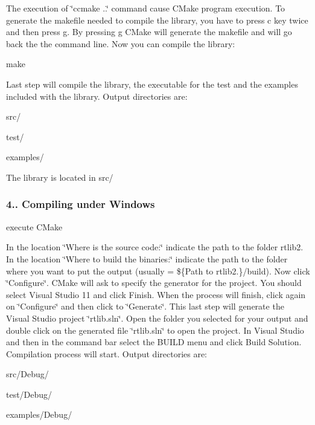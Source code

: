 The execution of \char`\"{}ccmake ..\char`\"{} command cause C\+Make program execution. To generate the makefile needed to compile the library, you have to press \textquotesingle{}c\textquotesingle{} key twice and then press \textquotesingle{}g\textquotesingle{}. By pressing \textquotesingle{}g\textquotesingle{} C\+Make will generate the makefile and will go back the the command line. Now you can compile the library\+: \begin{DoxyVerb}make 
\end{DoxyVerb}


Last step will compile the library, the executable for the test and the examples included with the library. Output directories are\+:
\begin{DoxyItemize}
\item src/
\item test/
\item examples/
\end{DoxyItemize}

The library is located in src/

\subsubsection*{4.. Compiling under Windows}

\begin{DoxyVerb}execute CMake
\end{DoxyVerb}


In the location \char`\"{}\+Where is the source code\+:\char`\"{} indicate the path to the folder rtlib2. In the location \char`\"{}\+Where to build the binaries\+:\char`\"{} indicate the path to the folder where you want to put the output (usually = \$\{Path to rtlib2.\}/build). Now click \char`\"{}\+Configure\char`\"{}. C\+Make will ask to specify the generator for the project. You should select Visual Studio 11 and click Finish. When the process will finish, click again on \char`\"{}\+Configure\char`\"{} and then click to \char`\"{}\+Generate\char`\"{}. This last step will generate the Visual Studio project \char`\"{}rtlib.\+sln\char`\"{}. Open the folder you selected for your output and double click on the generated file \char`\"{}rtlib.\+sln\char`\"{} to open the project. In Visual Studio and then in the command bar select the B\+U\+I\+LD menu and click Build Solution. Compilation process will start. Output directories are\+:
\begin{DoxyItemize}
\item src/\+Debug/
\item test/\+Debug/
\item examples/\+Debug/
\end{DoxyItemize}

